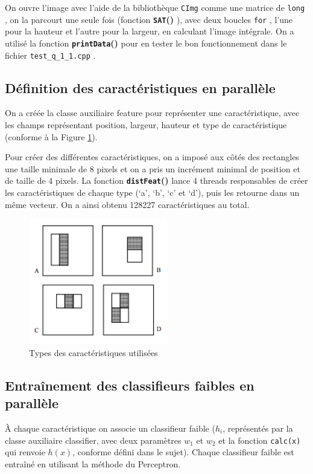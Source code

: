 \documentclass[a4paper, 12pt,twoside]{article}
\newcommand{\func}[1]{
\textbf{\texttt{#1}()}
}
\newcommand{\param}[1]{
\texttt{#1}
}
\begin{document}
	On ouvre l’image avec l’aide de la bibliothèque \param{CImg} comme une matrice de \param{long}, on la parcourt une seule fois (fonction \func{SAT}), avec deux boucles \param{for}, l’une pour la hauteur et l’autre pour la largeur, en calculant l’image intégrale. On a utilisé la fonction \func{printData} pour en tester le bon fonctionnement dans le fichier \param{test\_q\_1\_1.cpp}.


\subsection{Définition des caractéristiques en parallèle}

	On a créée la classe auxiliaire feature pour représenter une caractéristique, avec les champs représentant position, largeur, hauteur et type de caractéristique (conforme à la Figure \ref{caracteristiques}).
	
	Pour créer des différentes caractéristiques, on a imposé aux côtés des rectangles une taille minimale de 8 pixels et on a pris un incrément minimal de position et de taille de  4 pixels. La fonction \func{distFeat} lance 4 threads responsables de créer les caractéristiques de chaque type (‘a’, ‘b’, ‘c’ et ‘d’), puis les retourne dans un même vecteur. On a ainsi obtenu 128227 caractéristiques au total.


\begin{figure}[htbp]
\centering
\includegraphics[scale=0.8]{charact}
\caption{Types des caractéristiques utilisées}
\label{caracteristiques}
\end{figure}

\subsection{Entraînement des classifieurs faibles en parallèle}

	À chaque caractéristique on associe un classifieur faible ($h_i$, représentés par la classe auxiliaire classifier, avec deux paramètres $w_1$ et $w_2$ et la fonction \param{calc(x)} qui renvoie $h(x)$, conforme défini dans le sujet). Chaque classifieur faible est entraîné en utilisant la méthode du Perceptron.
	
\end{document}
